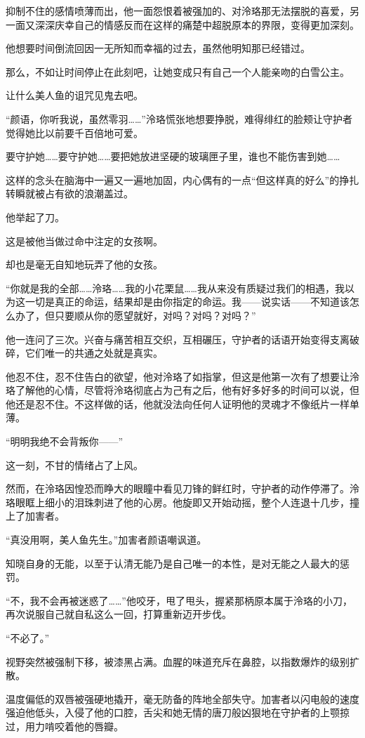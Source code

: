 \documentclass[UTF8, scheme = chinese, openany]{ctexbook}
\begin{document}
抑制不住的感情喷薄而出，他一面怨恨着被强加的、对泠珞那无法摆脱的喜爱，另一面又深深庆幸自己的情感反而在这样的痛楚中超脱原本的界限，变得更加深刻。

他想要时间倒流回因一无所知而幸福的过去，虽然他明知那已经错过。

那么，不如让时间停止在此刻吧，让她变成只有自己一个人能亲吻的白雪公主。

让什么美人鱼的诅咒见鬼去吧。

“颜语，你听我说，虽然零羽……”泠珞慌张地想要挣脱，难得绯红的脸颊让守护者觉得她比以前要千百倍地可爱。

要守护她……要守护她……要把她放进坚硬的玻璃匣子里，谁也不能伤害到她……

这样的念头在脑海中一遍又一遍地加固，内心偶有的一点“但这样真的好么”的挣扎转瞬就被占有欲的浪潮盖过。

他举起了刀。

这是被他当做过命中注定的女孩啊。

却也是毫无自知地玩弄了他的女孩。

“你就是我的全部……泠珞……我的小花栗鼠……我从来没有质疑过我们的相遇，我以为这一切是真正的命运，结果却是由你指定的命运。我——说实话——不知道该怎么办了，但只要顺从你的愿望就好，对吗？对吗？对吗？”

他一连问了三次。兴奋与痛苦相互交织，互相碾压，守护者的话语开始变得支离破碎，它们唯一的共通之处就是真实。

他忍不住，忍不住告白的欲望，他对泠珞了如指掌，但这是他第一次有了想要让泠珞了解他的心情，尽管将泠珞彻底占为己有之后，他有好多好多的时间可以说，但他还是忍不住。不这样做的话，他就没法向任何人证明他的灵魂才不像纸片一样单薄。

“明明我绝不会背叛你——”

这一刻，不甘的情绪占了上风。

然而，在泠珞因惶恐而睁大的眼瞳中看见刀锋的鲜红时，守护者的动作停滞了。泠珞眼眶上细小的泪珠刺进了他的心房。他旋即又开始动摇，整个人连退十几步，撞上了加害者。

“真没用啊，美人鱼先生。”加害者颜语嘲讽道。

知晓自身的无能，以至于认清无能乃是自己唯一的本性，是对无能之人最大的惩罚。

“不，我不会再被迷惑了……”他咬牙，甩了甩头，握紧那柄原本属于泠珞的小刀，再次说服自己就自私这么一回，打算重新迈开步伐。

“不必了。”

视野突然被强制下移，被漆黑占满。血腥的味道充斥在鼻腔，以指数爆炸的级别扩散。

温度偏低的双唇被强硬地撬开，毫无防备的阵地全部失守。加害者以闪电般的速度强迫他低头，入侵了他的口腔，舌尖和她无情的唐刀般凶狠地在守护者的上颚掠过，用力啃咬着他的唇瓣。
\end{document}
